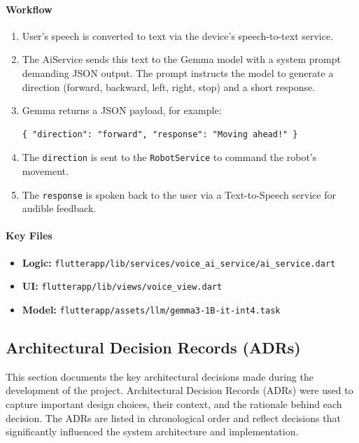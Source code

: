 \documentclass[11pt,a4paper]{article}
\begin{document}
\paragraph{Workflow}
\begin{enumerate}
    \item User's speech is converted to text via the device's speech-to-text service.
    \item The AiService sends this text to the Gemma model with a system prompt demanding JSON output. The prompt instructs the model to generate a direction (forward, backward, left, right, stop) and a short response.
    \item Gemma returns a JSON payload, for example:
    \begin{verbatim}
{ "direction": "forward", "response": "Moving ahead!" }
    \end{verbatim}
    \item The \texttt{direction} is sent to the \texttt{RobotService} to command the robot's movement.
    \item The \texttt{response} is spoken back to the user via a Text-to-Speech service for audible feedback.
\end{enumerate}

\paragraph{Key Files}
\begin{itemize}
    \item \textbf{Logic:} \texttt{flutterapp/lib/services/voice\_ai\_service/ai\_service.dart}
    \item \textbf{UI:} \texttt{flutterapp/lib/views/voice\_view.dart}
    \item \textbf{Model:} \texttt{flutterapp/assets/llm/gemma3-1B-it-int4.task}
\end{itemize}


\subsection{Architectural Decision Records (ADRs)}

This section documents the key architectural decisions made during the development of the project. Architectural Decision Records (ADRs) were used to capture important design choices, their context, and the rationale behind each decision. The ADRs are listed in chronological order and reflect decisions that significantly influenced the system architecture and implementation.
\end{document}
